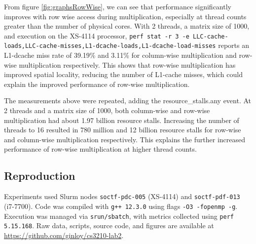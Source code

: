\documentclass{article}
\begin{document}
From figure \ref{fig:graphsRowWise}, we can see that performance significantly improves with row wise access during multiplication, especially at thread counts greater than the number of physical cores. With 2 threads, a matrix size of 1000, and execution on the XS-4114 processor, \texttt{perf stat -r 3 -e LLC-cache-loads,LLC-cache-misses,L1-dcache-loads,L1-dcache-load-misses} reports an L1-dcache miss rate of 39.19\% and 3.11\% for column-wise multiplication and row-wise multiplication respectively. This shows that row-wise multiplication has improved spatial locality, reducing the number of L1-cache misses, which could explain the improved performance of row-wise multiplication.

The measurements above were repeated, adding the resource_stalls.any event. At 2 threads and a matrix size of 1000, both column-wise and row-wise multiplication had about 1.97 billion resource stalls. Increasing the number of threads to 16 resulted in 780 million and 12 billion resource stalls for row-wise and column-wise multiplication respectively. This explains the further increased performance of row-wise multiplication at higher thread counts.

\newpage

\begin{appendices}

\section{Reproduction}
Experiments used Slurm nodes \texttt{soctf-pdc-005} (XS-4114) and \texttt{soctf-pdf-013} (i7-7700). Code was compiled with \texttt{g++ 12.3.0} using flags \texttt{-O3 -fopenmp -g}. Execution was managed via \texttt{srun/sbatch}, with metrics collected using \texttt{perf 5.15.168}. Raw data, scripts, source code, and figures are available at \url{https://github.com/ginloy/cs3210-lab2}.

\end{appendices}
\end{document}
